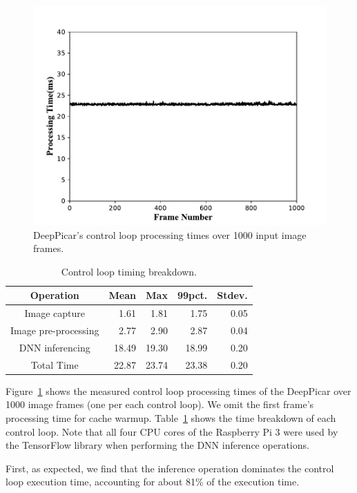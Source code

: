 
\begin{figure}[h]
  \centering
  \includegraphics[width=.5\textwidth]{figs/Fig7_new}
  \caption{DeepPicar's control loop processing times over 1000 input image frames.}
  \label{fig:control-loop-timing}
\end{figure}

\begin{table}[h]
  \centering
  \begin{tabular} {| c | r | r | r | r |}
    \hline
    \textbf{Operation} & \textbf{Mean} & \textbf{Max} &   \textbf{99pct.} & \textbf{Stdev.} \\ \hline
    Image capture        & 1.61  &  1.81 &  1.75  & 0.05 \\ \hline
    Image pre-processing & 2.77  &  2.90 &  2.87  & 0.04 \\ \hline
    DNN inferencing      & 18.49 & 19.30 & 18.99  & 0.20 \\ \hline
    Total Time           & 22.87 & 23.74 & 23.38  & 0.20 \\ \hline
  \end{tabular}
  \caption{Control loop timing breakdown.}
  \label{tbl:control-loop-breakdown}
\end{table}

Figure~\ref{fig:control-loop-timing} shows the measured control loop 
processing times of the DeepPicar over 1000 image frames (one per each
control loop). We omit the first frame's processing time for cache
warmup. Table~\ref{tbl:control-loop-breakdown} shows the time
breakdown of each control loop. Note that all four CPU cores of the
Raspberry Pi 3 were used by the TensorFlow library when performing the
DNN inference operations.

First, as expected, we find that the inference operation
dominates the control loop execution time, accounting for about 81\% of
the execution time.

